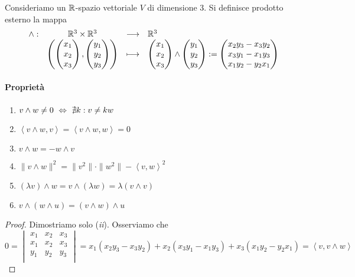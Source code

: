\documentclass{article}     %
\newcommand{\scp}[1][\cdot,\cdot]{\left\langle #1 \right\rangle}
\begin{document}
\begin{boxdef}
    Consideriamo un $\mathbb{R}$-spazio vettoriale $V$ di dimensione 3. Si definisce prodotto esterno la mappa 
    \[\begin{array}{cccl} \wedge : & \mathbb{R}^3\times \mathbb{R}^3 & \longrightarrow & \mathbb{R}^3 \\ & \left(\begin{pmatrix}
        x_1\\x_2\\x_3
    \end{pmatrix}, \begin{pmatrix}
        y_1\\y_2\\y_3
    \end{pmatrix}\right) & \longmapsto & \begin{pmatrix}
        x_1\\x_2\\x_3
    \end{pmatrix}\wedge \begin{pmatrix}
        y_1\\y_2\\y_3
    \end{pmatrix}:=\begin{pmatrix}
        x_2y_3-x_3y_2\\x_3y_1-x_1y_3\\x_1y_2-y_2x_1
    \end{pmatrix} \end{array}\]
\end{boxdef}
\paragraph{Proprietà}
\begin{enumerate}[label=$\roman*$)]
    \item $v\wedge w\neq 0\ \Leftrightarrow\ \nexists k : v\neq kw$
    \item $\scp[v\wedge w, v]= \scp[v\wedge w, w]=0$
    \item $v\wedge w = -w\wedge v$
    \item $\|v\wedge w\|^2=\|v^2\|\cdot\|w^2\|-\scp[v,w]^2$
    \item $(\lambda v)\wedge w = v\wedge (\lambda w)= \lambda (v\wedge v)$
    \item $v\land (w\land u)=(v\land w)\land u$
\end{enumerate}
\begin{proof} Dimostriamo solo (\textit{ii}). Osserviamo che 
    \[0=\begin{vmatrix}
        x_1&x_2&x_3\\
        x_1&x_2&x_3\\
        y_1&y_2&y_3\\
    \end{vmatrix}=x_1(x_2y_3-x_3y_2)+x_2(x_3y_1-x_1y_3)+x_3(x_1y_2-y_2x_1)=\scp[v, v\wedge w]\]
    
\end{proof}
\end{document}
